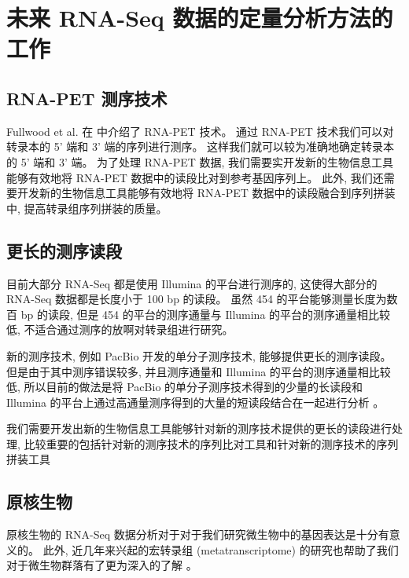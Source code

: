 \section{未来 RNA-Seq 数据的定量分析方法的工作}

\subsection{RNA-PET 测序技术} %
Fullwood et al. 在  中介绍了 RNA-PET 技术。 
通过 RNA-PET 技术我们可以对转录本的 5' 端和 3' 端的序列进行测序。 
这样我们就可以较为准确地确定转录本的 5' 端和 3' 端。 
为了处理 RNA-PET 数据, 我们需要实开发新的生物信息工具能够有效地将 RNA-PET 
数据中的读段比对到参考基因序列上。 此外, 我们还需要开发新的生物信息工具能够有效地将 RNA-PET 
数据中的读段融合到序列拼装中, 提高转录组序列拼装的质量。 

\subsection{更长的测序读段} %
目前大部分 RNA-Seq 都是使用 Illumina 的平台进行测序的, 
这使得大部分的 RNA-Seq 数据都是长度小于 100 bp 的读段。 
虽然 454 的平台能够测量长度为数百 bp 的读段, 
但是 454 的平台的测序通量与 Illumina 的平台的测序通量相比较低, 
不适合通过测序的放啊对转录组进行研究。 

新的测序技术, 例如 PacBio 开发的单分子测序技术, 能够提供更长的测序读段。 
但是由于其中测序错误较多, 并且测序通量和 Illumina 的平台的测序通量相比较低, 
所以目前的做法是将 PacBio 的单分子测序技术得到的少量的长读段和 Illumina 
的平台上通过高通量测序得到的大量的短读段结合在一起进行分析 \cite{hybrid.rna.seq.2012}。 

我们需要开发出新的生物信息工具能够针对新的测序技术提供的更长的读段进行处理, 
比较重要的包括针对新的测序技术的序列比对工具和针对新的测序技术的序列拼装工具

\subsection{原核生物}
原核生物的 RNA-Seq 数据分析对于对于我们研究微生物中的基因表达是十分有意义的。 
此外, 近几年来兴起的宏转录组 (metatranscriptome) 的研究也帮助了我们对于微生物群落有了更为深入的了解
\cite{gilbert2008detection, urich2008simultaneous, gifford2010quantitative, 
helbling2011activity, mason2012metagenome, huson2011integrative, 
lesniewski2012metatranscriptome}。 

\nocite{sorek2009prokaryotic}

